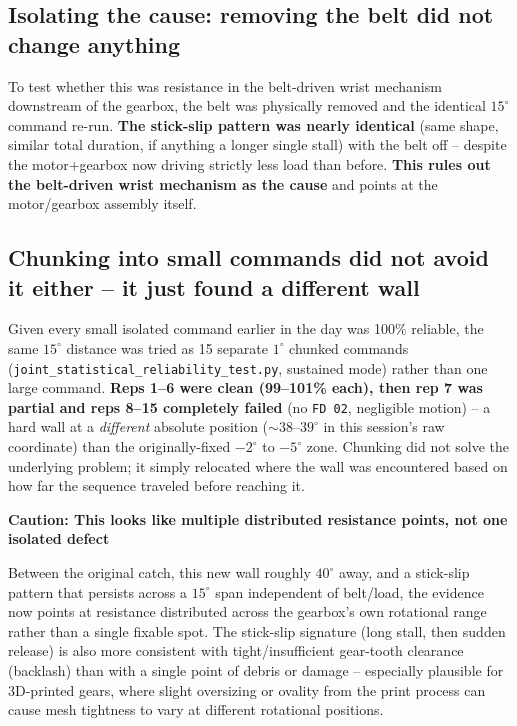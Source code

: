 \documentclass[11pt,letterpaper]{article}
\newenvironment{caution}[1]{%
    \par\addvspace{8pt}%
    \noindent{\color{cautionred}\rule{\linewidth}{0.8pt}}\par\vspace{2pt}
    \noindent\textbf{\color{cautionred}Caution: #1}\par\vspace{2pt}
}{%
    \par\vspace{2pt}\noindent{\color{cautionred}\rule{\linewidth}{0.4pt}}%
    \par\addvspace{8pt}%
}
\begin{document}
\subsection{Isolating the cause: removing the belt did not change anything}
To test whether this was resistance in the belt-driven wrist mechanism downstream of the gearbox, the belt was physically removed and the identical $15^\circ$ command re-run. \textbf{The stick-slip pattern was nearly identical} (same shape, similar total duration, if anything a longer single stall) with the belt off -- despite the motor+gearbox now driving strictly less load than before. \textbf{This rules out the belt-driven wrist mechanism as the cause} and points at the motor/gearbox assembly itself.

\subsection{Chunking into small commands did not avoid it either -- it just found a different wall}
Given every small isolated command earlier in the day was 100\% reliable, the same $15^\circ$ distance was tried as 15 separate $1^\circ$ chunked commands (\texttt{joint\_statistical\_reliability\_test.py}, sustained mode) rather than one large command. \textbf{Reps 1--6 were clean (99--101\% each), then rep 7 was partial and reps 8--15 completely failed} (no \texttt{FD 02}, negligible motion) -- a hard wall at a \emph{different} absolute position ($\sim$$38$--$39^\circ$ in this session's raw coordinate) than the originally-fixed $-2^\circ$ to $-5^\circ$ zone. Chunking did not solve the underlying problem; it simply relocated where the wall was encountered based on how far the sequence traveled before reaching it.

\begin{caution}{This looks like multiple distributed resistance points, not one isolated defect}
Between the original catch, this new wall roughly $40^\circ$ away, and a stick-slip pattern that persists across a $15^\circ$ span independent of belt/load, the evidence now points at resistance distributed across the gearbox's own rotational range rather than a single fixable spot. The stick-slip signature (long stall, then sudden release) is also more consistent with tight/insufficient gear-tooth clearance (backlash) than with a single point of debris or damage -- especially plausible for 3D-printed gears, where slight oversizing or ovality from the print process can cause mesh tightness to vary at different rotational positions.
\end{caution}
\end{document}
